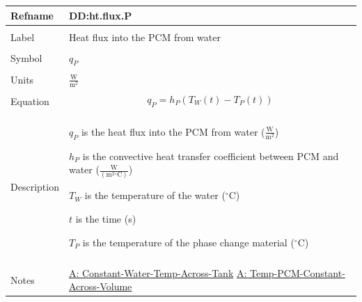 \documentclass[12pt]{article}
\begin{document}
 \noindent \begin{minipage}{\textwidth}
\begin{tabular}{p{} p{}}
\toprule \textbf{Refname} & \textbf{DD:ht.flux.P}
\label{DD:ht.flux.P}
\\ \midrule \\
Label & Heat flux into the PCM from water
        \\ \midrule \\
        Symbol & ${q_{P}}$
                 \\ \midrule \\
                 Units & $\frac{\text{W}}{\text{m}^{2}}$
                         \\ \midrule \\
                         Equation & \begin{dmath}
                                    {q_{P}}={h_{P}} \left({T_{W}}\left(t\right)-{T_{P}}\left(t\right)\right)
                                    \end{dmath}
                                    \\ \midrule \\
                                    Description & \begin{symbDescription}
                                                  \item{${q_{P}}$ is the heat flux into the PCM from water ($\frac{\text{W}}{\text{m}^{2}}$)}
                                                  \item{${h_{P}}$ is the convective heat transfer coefficient between PCM and water ($\frac{\text{W}}{(\text{m}^{2}{}^{\circ}\text{C})}$)}
                                                  \item{${T_{W}}$ is the temperature of the water (${}^{\circ}$C)}
                                                  \item{$t$ is the time (s)}
                                                  \item{${T_{P}}$ is the temperature of the phase change material (${}^{\circ}$C)}
                                                  \end{symbDescription}
                                                  \\ \midrule \\
                                                  Notes & \hyperref[A:Constant-Water-Temp-Across-Tank]{A: Constant-Water-Temp-Across-Tank}
                                                          \hyperref[A:Temp-PCM-Constant-Across-Volume]{A: Temp-PCM-Constant-Across-Volume}

\end{tabular}
\end{minipage}
\end{document}
